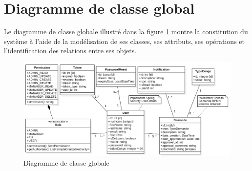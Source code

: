 \section{Diagramme de classe global}
Le diagramme de classe globale illustré dans la figure \ref{classDiagram} montre la constitution du système
à l’aide de la modélisation de ses classes, ses attributs, ses opérations et l’identification
des relations entre ses objets.
\begin{figure}[H]
\begin{adjustwidth}{-2cm}{-2cm} %
\centering
\includegraphics[width=21cm]{images/ClassDiagram.jpg}
\caption{Diagramme de classe globale}
\label{classDiagram}
\end{adjustwidth}
\end{figure}
